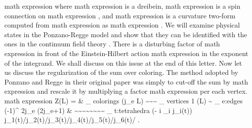 \documentclass[11pt]{article}
\begin{document}
math expression where math expression is a dreibein, math expression is a spin connection on math expression , and math expression is a curvature two-form computed from math expression as math expression . We will examine physical states in the Ponzano-Regge model and show that they can be identified with the ones in the continuum field theory . There is a disturbing factor of math expression in front of the Einstein-Hilbert action math expression in the exponent of the integrand. We shall discuss on this issue at the end of this letter. Now let us discuss the regularization of the sum over coloring. The method adopted by Ponzano and Regge in their original paper was simply to cut-off the sum by math expression and rescale it by multiplying a factor math expression per each vertex. math expression Z(L) = \& \_ colorings (j\_e L) \textasciitilde{}\textasciitilde{}\textasciitilde{} \_ vertices 1 (L) \textasciitilde{} \_ e:edges (-1)\textasciicircum{} 2j\_e (2j\_e+1) \& \textasciitilde{}\textasciitilde{}\textasciitilde{}\textasciitilde{}\textasciitilde{}\textasciitilde{}\textasciitilde{}\textasciitilde{} \_ t:tetrahedra (- i \_i j\_i(t)) j\_1(t)/j\_2(t)/j\_3(t)/j\_4(t)/j\_5(t)/j\_6(t)/ .
\end{document}
